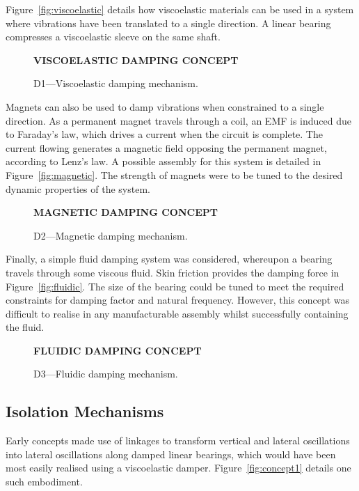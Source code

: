 \documentclass[11pt]{article}
\begin{document}
Figure~\vref{fig:viscoelastic} details how viscoelastic materials can be used 
in a system where vibrations have been translated to a single direction. A 
linear bearing compresses a viscoelastic sleeve on the same shaft.

\begin{figure}[h] 
    \centering
    \textbf{VISCOELASTIC DAMPING CONCEPT}
    \caption{D1---Viscoelastic damping mechanism.}
    \label{fig:viscoelastic}
\end{figure}

Magnets can also be used to damp vibrations when constrained to a single 
direction. As a permanent magnet travels through a coil, an EMF is induced due 
to Faraday's law, which drives a current when the circuit is complete. The 
current flowing generates a magnetic field opposing the permanent magnet, 
according to Lenz's law. A possible assembly for this system is detailed in 
Figure~\vref{fig:magnetic}. The strength of magnets were to be tuned to the 
desired dynamic properties of the system.

\begin{figure}[h] 
    \centering
    \textbf{MAGNETIC DAMPING CONCEPT}
    \caption{D2---Magnetic damping mechanism.}
    \label{fig:magnetic}
\end{figure}

Finally, a simple fluid damping system was considered, whereupon a bearing 
travels through some viscous fluid. Skin friction provides the damping force in 
Figure~\vref{fig:fluidic}. The size of the bearing could be tuned to meet the 
required constraints for damping factor and natural frequency. However, this 
concept was difficult to realise in any manufacturable assembly whilst 
successfully containing the fluid.

\begin{figure}[h] 
    \centering
    \textbf{FLUIDIC DAMPING CONCEPT}
    \caption{D3---Fluidic damping mechanism.}
    \label{fig:fluidic}
\end{figure}

\subsection{Isolation Mechanisms}

Early concepts made use of linkages to transform vertical and lateral 
oscillations into lateral oscillations along damped linear bearings, which 
would have been most easily realised using a viscoelastic damper. 
Figure~\vref{fig:concept1} details one such embodiment.
\end{document}
